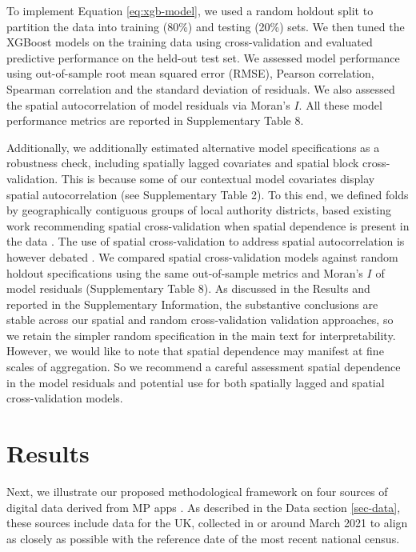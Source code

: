 \documentclass[]{rsos}%
\begin{document}
To implement Equation \ref{eq:xgb-model}, we used a random holdout split
to partition the data into training (80\%) and testing (20\%) sets. We
then tuned the XGBoost models on the training data using
cross-validation and evaluated predictive performance on the held-out
test set. We assessed model performance using out-of-sample root mean
squared error (RMSE), Pearson correlation, Spearman correlation and the
standard deviation of residuals. We also assessed the spatial
autocorrelation of model residuals via Moran's \(I\). All these model
performance metrics are reported in Supplementary Table 8.

Additionally, we additionally estimated alternative model specifications
as a robustness check, including spatially lagged covariates and spatial
block cross-validation. This is because some of our contextual model
covariates display spatial autocorrelation (see Supplementary Table 2).
To this end, we defined folds by geographically contiguous groups of
local authority districts, based existing work recommending spatial
cross-validation when spatial dependence is present in the data
\citep{roberts17}. The use of spatial cross-validation to address spatial
autocorrelation is however debated \citep{Wadoux21}. We compared spatial
cross-validation models against random holdout specifications using the
same out-of-sample metrics and Moran's \(I\) of model residuals
(Supplementary Table 8). As discussed in the Results and reported in the
Supplementary Information, the substantive conclusions are stable across
our spatial and random cross-validation validation approaches, so we
retain the simpler random specification in the main text for
interpretability. However, we would like to note that spatial dependence
may manifest at fine scales of aggregation. So we recommend a careful
assessment spatial dependence in the model residuals and potential use
for both spatially lagged and spatial cross-validation models.

\section{Results}\label{results}

Next, we illustrate our proposed methodological framework on four
sources of digital data derived from MP apps . As described in the Data
section \ref{sec-data}, these sources include data for the UK,
collected in or around March 2021 to align as closely as possible with
the reference date of the most recent national census.
\end{document}
